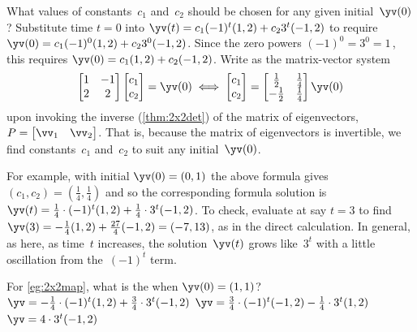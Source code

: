 \begin{example}
\begin{solution}
What values of constants~\(c_1\) and~\(c_2\) should be chosen for any given initial~\(\yv(0)\)?
Substitute time \(t=0\) into \(\yv(t)=c_1(-1)^t(1,2)+c_23^t(-1,2)\) to require \(\yv(0)=c_1(-1)^0(1,2)+c_23^0(-1,2)\).
Since the zero powers \((-1)^0=3^0=1\)\,, this requires \(\yv(0)=c_1(1,2)+c_2(-1,2)\).
Write as the matrix-vector system
\begin{equation*}
\begin{bmatrix} 1&-1\\2&2 \end{bmatrix}
\begin{bmatrix} c_1\\c_2 \end{bmatrix}
=\yv(0)
\iff
\begin{bmatrix} c_1\\c_2 \end{bmatrix}
=\begin{bmatrix} \frac12&\frac14\\-\frac12&\frac14 \end{bmatrix}\yv(0)
\end{equation*}
upon invoking the inverse (\cref{thm:2x2det}) of the matrix of eigenvectors, \(P=\begin{bmatrix} \vv_1&\vv_2 \end{bmatrix}\).
That is, because the matrix of eigenvectors is invertible, we find constants~\(c_1\) and~\(c_2\) to suit any initial~\(\yv(0)\).

For example, with initial \(\yv(0)=(0,1)\) the above formula gives \((c_1,c_2)=(\frac14,\frac14)\) and so the corresponding formula solution is \(\yv(t)=\frac14\cdot(-1)^t(1,2)+\frac14\cdot3^t(-1,2)\).
To check, evaluate at say \(t=3\) to find 
\(\yv(3)=-\frac14(1,2)+\frac{27}4(-1,2)=(-7,13)\),
as in the direct calculation.
In general, as here, as time~\(t\) increases, the solution~\(\yv(t)\) grows like~\(3^t\) with a little oscillation from the~\((-1)^t\) term.
\end{solution}
\end{example}




\begin{activity}
For \cref{eg:2x2map}, what is the  when \(\yv(0)=(1,1)\)?
{\(\yv=-\frac14\cdot(-1)^t(1,2)+\frac34\cdot3^t(-1,2)\)}
{\(\yv=\frac34\cdot(-1)^t(-1,2)-\frac14\cdot3^t(1,2)\)}
{\(\yv=4\cdot3^t(-1,2)\)}
\end{activity}




